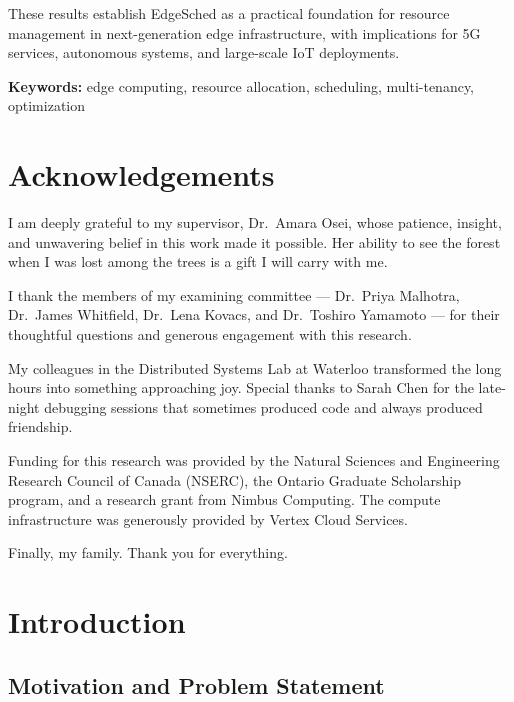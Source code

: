 \documentclass[12pt,letterpaper,twoside]{report}
\begin{document}
These results establish EdgeSched as a practical foundation for resource management in next-generation edge infrastructure, with implications for 5G services, autonomous systems, and large-scale IoT deployments.

\vspace{\baselineskip}
\noindent\textbf{Keywords:} edge computing, resource allocation, scheduling, multi-tenancy, optimization

\chapter*{Acknowledgements}

I am deeply grateful to my supervisor, Dr.~Amara Osei, whose patience, insight, and unwavering belief in this work made it possible. Her ability to see the forest when I was lost among the trees is a gift I will carry with me.

I thank the members of my examining committee --- Dr.~Priya Malhotra, Dr.~James Whitfield, Dr.~Lena Kovacs, and Dr.~Toshiro Yamamoto --- for their thoughtful questions and generous engagement with this research.

My colleagues in the Distributed Systems Lab at Waterloo transformed the long hours into something approaching joy. Special thanks to Sarah Chen for the late-night debugging sessions that sometimes produced code and always produced friendship.

Funding for this research was provided by the Natural Sciences and Engineering Research Council of Canada (NSERC), the Ontario Graduate Scholarship program, and a research grant from Nimbus Computing. The compute infrastructure was generously provided by Vertex Cloud Services.

Finally, my family. Thank you for everything.

\newpage

\tableofcontents
\newpage
\listoffigures
\newpage
\listoftables
\newpage


\chapter{Introduction}

\section{Motivation and Problem Statement}
\end{document}
